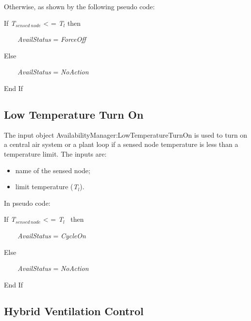 Otherwise, as shown by the following pseudo code:

If \emph{T\(_{sensed~node}\)} \textless{} = \emph{T\(_{l}\)} then

~~~~\emph{AvailStatus} = \emph{ForceOff}

Else

~~~~\emph{AvailStatus} = \emph{NoAction}

End If

\subsection{Low Temperature Turn On}\label{low-temperature-turn-on}

The input object AvailabilityManager:LowTemperatureTurnOn is used to turn on a central air system or a plant loop if a sensed node temperature is less than a temperature limit. The inputs are:

\begin{itemize}
\item name of the sensed node;
\item limit temperature (\emph{T\(_{l}\)}).
\end{itemize}

In pseudo code:

If \emph{T\(_{sensed\, node}\)} \textless{} = \emph{T\(_{l}\)}~ then

~~~~\emph{AvailStatus} = \emph{CycleOn}

Else

~~~~\emph{AvailStatus} = \emph{NoAction}

End If

\subsection{Hybrid Ventilation Control}\label{hybrid-ventilation-control}

